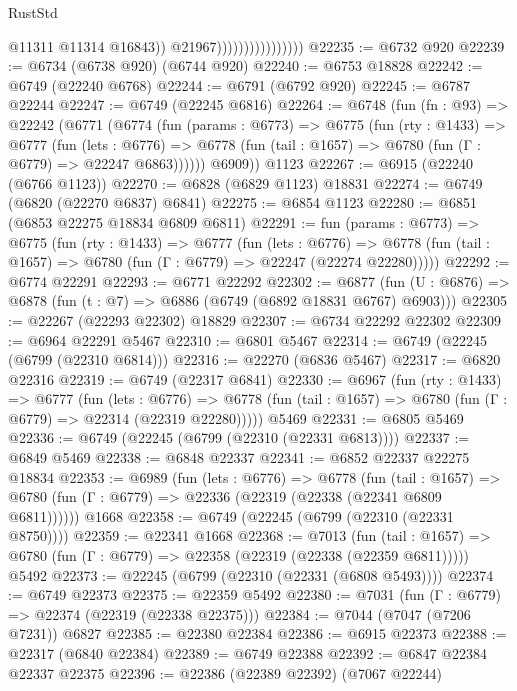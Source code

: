 \begin{lexlean}{RustStd}
\begin{coremodule}
                                        @11311
                                        @11314
                                        @16843))
                                    @21967))))))))))))))))
@22235 := @6732 @920
@22239 := @6734 (@6738 @920) (@6744 @920)
@22240 := @6753 @18828
@22242 := @6749 (@22240 @6768)
@22244 := @6791 (@6792 @920)
@22245 := @6787 @22244
@22247 := @6749 (@22245 @6816)
@22264 := @6748
    (fun (fn : @93) =>
    @22242
      (@6771
        (@6774
          (fun (params : @6773) =>
          @6775
            (fun (rty : @1433) =>
            @6777
              (fun (lets : @6776) =>
              @6778 (fun (tail : @1657) => @6780 (fun (Γ : @6779) => @22247 @6863))))))
        @6909))
    @1123
@22267 := @6915 (@22240 (@6766 @1123))
@22270 := @6828 (@6829 @1123) @18831
@22274 := @6749 (@6820 (@22270 @6837) @6841)
@22275 := @6854 @1123
@22280 := @6851 (@6853 @22275 @18834 @6809 @6811)
@22291 := fun (params : @6773) =>
  @6775
    (fun (rty : @1433) =>
    @6777
      (fun (lets : @6776) =>
      @6778 (fun (tail : @1657) => @6780 (fun (Γ : @6779) => @22247 (@22274 @22280)))))
@22292 := @6774 @22291
@22293 := @6771 @22292
@22302 := @6877
    (fun (U : @6876) => @6878 (fun (t : @7) => @6886 (@6749 (@6892 @18831 @6767) @6903)))
@22305 := @22267 (@22293 @22302) @18829
@22307 := @6734 @22292 @22302
@22309 := @6964 @22291 @5467
@22310 := @6801 @5467
@22314 := @6749 (@22245 (@6799 (@22310 @6814)))
@22316 := @22270 (@6836 @5467)
@22317 := @6820 @22316
@22319 := @6749 (@22317 @6841)
@22330 := @6967
    (fun (rty : @1433) =>
    @6777
      (fun (lets : @6776) =>
      @6778 (fun (tail : @1657) => @6780 (fun (Γ : @6779) => @22314 (@22319 @22280)))))
    @5469
@22331 := @6805 @5469
@22336 := @6749 (@22245 (@6799 (@22310 (@22331 @6813))))
@22337 := @6849 @5469
@22338 := @6848 @22337
@22341 := @6852 @22337 @22275 @18834
@22353 := @6989
    (fun (lets : @6776) =>
    @6778
      (fun (tail : @1657) =>
      @6780 (fun (Γ : @6779) => @22336 (@22319 (@22338 (@22341 @6809 @6811))))))
    @1668
@22358 := @6749 (@22245 (@6799 (@22310 (@22331 @8750))))
@22359 := @22341 @1668
@22368 := @7013
    (fun (tail : @1657) => @6780 (fun (Γ : @6779) => @22358 (@22319 (@22338 (@22359 @6811)))))
    @5492
@22373 := @22245 (@6799 (@22310 (@22331 (@6808 @5493))))
@22374 := @6749 @22373
@22375 := @22359 @5492
@22380 := @7031 (fun (Γ : @6779) => @22374 (@22319 (@22338 @22375)))
@22384 := @7044 (@7047 (@7206 @7231)) @6827
@22385 := @22380 @22384
@22386 := @6915 @22373
@22388 := @22317 (@6840 @22384)
@22389 := @6749 @22388
@22392 := @6847 @22384 @22337 @22375
@22396 := @22386 (@22389 @22392) (@7067 @22244)

\end{coremodule}
\end{lexlean}
